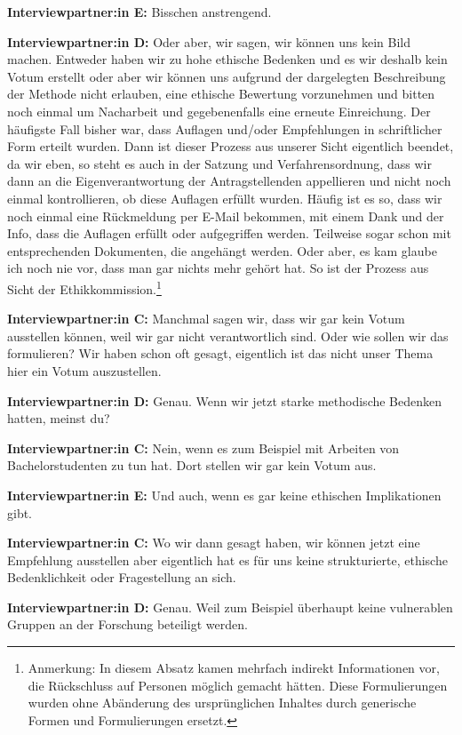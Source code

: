 \documentclass[a4paper,12pt,twoside]{scrreprt}
\begin{document}
\textbf{Interviewpartner:in E:} Bisschen anstrengend.

\textbf{Interviewpartner:in D:} Oder aber, wir sagen, wir können uns kein Bild machen. Entweder haben wir zu hohe ethische Bedenken und es wir deshalb kein Votum erstellt oder aber wir können uns aufgrund der dargelegten Beschreibung der Methode nicht erlauben, eine ethische Bewertung vorzunehmen und bitten noch einmal um Nacharbeit und gegebenenfalls eine erneute Einreichung. Der häufigste Fall bisher war, dass Auflagen und/oder Empfehlungen in schriftlicher Form erteilt wurden. Dann ist dieser Prozess aus unserer Sicht eigentlich beendet, da wir eben, so steht es auch in der Satzung und Verfahrensordnung, dass wir dann an die Eigenverantwortung der Antragstellenden appellieren und nicht noch einmal kontrollieren, ob diese Auflagen erfüllt wurden. Häufig ist es so, dass wir noch einmal eine Rückmeldung per E-Mail bekommen, mit einem Dank und der Info, dass die Auflagen erfüllt oder aufgegriffen werden. Teilweise sogar schon mit entsprechenden Dokumenten, die angehängt werden. Oder aber, es kam glaube ich noch nie vor, dass man gar nichts mehr gehört hat. So ist der Prozess aus Sicht der Ethikkommission.\footnote{Anmerkung: In diesem Absatz kamen mehrfach indirekt Informationen vor, die Rückschluss auf Personen möglich gemacht hätten. Diese Formulierungen wurden ohne Abänderung des ursprünglichen Inhaltes durch generische Formen und Formulierungen ersetzt.}

\textbf{Interviewpartner:in C:} Manchmal sagen wir, dass wir gar kein Votum ausstellen können, weil wir gar nicht verantwortlich sind. Oder wie sollen wir das formulieren? Wir haben schon oft gesagt, eigentlich ist das nicht unser Thema hier ein Votum auszustellen.

\textbf{Interviewpartner:in D:} Genau. Wenn wir jetzt starke methodische Bedenken hatten, meinst du?

\textbf{Interviewpartner:in C:} Nein, wenn es zum Beispiel mit Arbeiten von Bachelorstudenten zu tun hat. Dort stellen wir gar kein Votum aus.

\textbf{Interviewpartner:in E:} Und auch, wenn es gar keine ethischen Implikationen gibt.

\textbf{Interviewpartner:in C:} Wo wir dann gesagt haben, wir können jetzt eine Empfehlung ausstellen aber eigentlich hat es für uns keine strukturierte, ethische Bedenklichkeit oder Fragestellung an sich.

\textbf{Interviewpartner:in D:} Genau. Weil zum Beispiel überhaupt keine vulnerablen Gruppen an der Forschung beteiligt werden.
\end{document}
